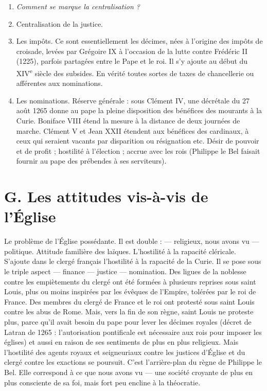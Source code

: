 \documentclass[french,twoside]{book} %
\newlength{\listmod}
\newcommand{\listhead}[1]{\hspace{-1\listmod}\emph{#1}}
\newcommand\chapterclose{} %
\begin{document}
\begin{enumerate}[itemsep=0pt,]
\item[]\listhead{Comment se marque la centralisation ?}
\item Centralisation de la justice.
\item Les impôts. Ce sont essentiellement les décimes, nées à l’origine des impôts de croisade, levées par Grégoire IX à l’occasion de la lutte contre Frédéric II (1225), parfois partagées entre le Pape et le roi. Il s’y ajoute au début du XIV\textsuperscript{e} siècle des subsides. En vérité toutes sortes de taxes de chancellerie ou afférentes aux nominations.
\item Les nominations. Réserve générale : sous Clément IV, une décrétale du 27 août 1265 donne au pape la pleine disposition des bénéfices des mourants à la Curie. Boniface VIII étend la mesure à la distance de deux journées de marche. Clément V et Jean XXII étendent aux bénéfices des cardinaux, à ceux qui seraient vacants par disparition ou résignation etc. Désir de pouvoir et de profit ; hostilité à l’élection ; accrue avec les rois (Philippe le Bel faisait fournir au pape des prébendes à ses serviteurs).

\end{enumerate}\section[G. Les attitudes vis-à-vis de l’Église]{G. Les attitudes vis-à-vis de l’Église}
\label{c10g}
\noindent Le problème de l’Église possédante. Il est double : — religieux, nous avons vu — politique. Attitude familière des laïques. L’hostilité à la rapacité cléricale. S’ajoute dans le clergé français l’hostilité à la rapacité de la Curie. Il se pose sous le triple aspect — finance — justice — nomination. Des ligues de la noblesse contre les empiètements du clergé ont été formées à plusieurs reprises sous saint Louis, plus ou moins inspirées par les évêques de l’Empire, tolérées par le roi de France. Des membres du clergé de France et le roi ont protesté sous saint Louis contre les abus de Rome. Mais, vers la fin de son règne, saint Louis ne proteste plus, parce qu’il avait besoin du pape pour lever les décimes royales (décret de Latran de 1265 : l’autorisation pontificale est nécessaire aux rois pour imposer les églises) et aussi en raison de ses sentiments de plus en plus religieux. Mais l’hostilité des agents royaux et seigneuriaux contre les justices d’Église et du clergé contre les exactions se poursuit. C’est l’arrière-plan du règne de Philippe le Bel. Elle correspond à ce que nous avons vu — une société croyante de plus en plus consciente de sa foi, mais fort peu encline à la théocratie.
\chapterclose
\end{document}
